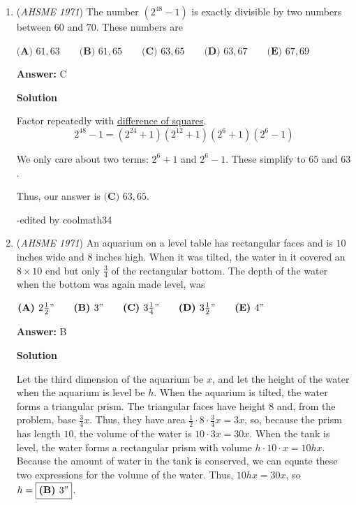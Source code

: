\begin{enumerate}
 


	\item (\textit{AHSME 1971}) The number $(2^{48}-1)$ is exactly divisible by two numbers between $60$ and $70$. These numbers are


 $\textbf{(A) }61,63\qquad \textbf{(B) }61,65\qquad \textbf{(C) }63,65\qquad \textbf{(D) }63,67\qquad  \textbf{(E) }67,69$

 \textbf{Answer: }C



\textbf{Solution}

Factor repeatedly with \href{https://artofproblemsolving.com/wiki/index.php?title=Difference\_of\_squares}{difference of squares}.
 \[2^{48}-1 = (2^{24}+1)(2^{12}+1)(2^{6}+1)(2^6-1)\]

 We only care about two terms: $2^6+1$ and $2^6-1$. These simplify to $65$ and $63$.

 Thus, our answer is $\boxed{\textbf{(C) }63,65}.$

 -edited by coolmath34

 


	\item (\textit{AHSME 1971}) An aquarium on a level table has rectangular faces and is $10$ inches wide and $8$ inches high. When it was tilted, 
the water in it covered an $8\times 10$ end but only $\frac{3}{4}$ of the rectangular bottom. The depth of the 
water when the bottom was again made level, was


 $\textbf{(A) }2\textstyle{\frac{1}{2}}"\qquad \textbf{(B) }3"\qquad \textbf{(C) }3\textstyle{\frac{1}{4}}"\qquad \textbf{(D) }3\textstyle{\frac{1}{2}}"\qquad \textbf{(E) }4"$

 \textbf{Answer: }B



\textbf{Solution}

Let the third dimension of the aquarium be $x$, and let the height of the water when the aquarium is level be $h$. When the aquarium is tilted, the water forms a triangular prism. The triangular faces have height $8$ and, from the problem, base $\frac34x$. Thus, they have area $\frac12\cdot8\cdot\frac34x=3x$, so, because the prism has length $10$, the volume of the water is $10\cdot3x=30x$. When the tank is level, the water forms a rectangular prism with volume $h\cdot10\cdot x=10hx$. Because the amount of water in the tank is conserved, we can equate these two expressions for the volume of the water. Thus, $10hx=30x$, so $h=\boxed{\textbf{(B) }3"}$.


\end{enumerate}
